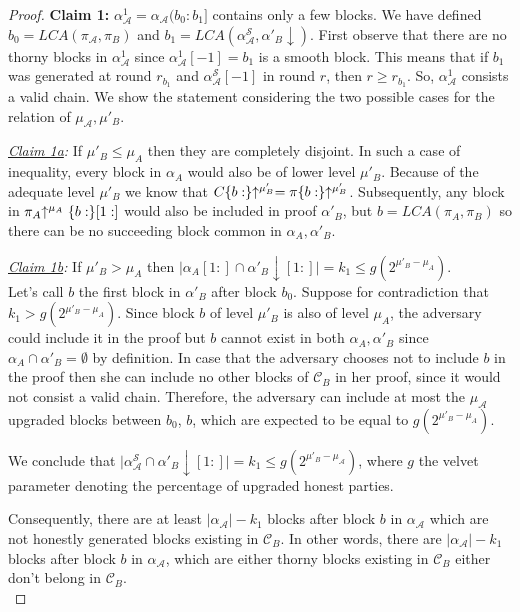 \begin{proof}
\textbf{Claim 1:} $\alpha_\mathcal{A}^1 = \alpha_\mathcal{A}(b_0 : b_1]$ contains only a few blocks. We have defined $b_0 = LCA(\pi_\mathcal{A}, \pi_B)$ and $b_1 = LCA(\alpha^{\mathcal{S}}_\mathcal{A}, \alpha'_B \downarrow)$. First observe that there are no thorny blocks in $\alpha_\mathcal{A}^1$ since $\alpha_\mathcal{A}^1[-1] = b_1$ is a smooth block. This means that if $b_1$ was generated at round $r_{b_1}$ and $\alpha^{\mathcal{S}}_\mathcal{A}[-1]$ in round $r$, then $r \geq r_{b_1}$. So, $\alpha_\mathcal{A}^1$ consists a valid chain. We show the statement considering the two possible cases for the relation of $\mu_\mathcal{A}, \mu'_B$.

\textit{\underline{Claim 1a}:} If $\mu'_B \leq \mu_A$ then they are completely disjoint. In such a case of inequality, every block in $\alpha_A$ would also be of lower level $\mu'_B$. Because of the adequate level $\mu'_B$ we know that $C\{b:\}\negthickspace\uparrow^{\mu'_B} = \pi\{b:\}\negthickspace\uparrow^{\mu'_B}$\cite{nipopows}. Subsequently, any block in $\pi_A\negthickspace\uparrow^{\mu_A}\{b:\}[1:]$ would also be included in proof $\alpha'_B$, but $b=LCA(\pi_A, \pi_B)$ so there can be no succeeding block common in $\alpha_A, \alpha'_B$.

\textit{\underline{Claim 1b}:} If  $\mu'_B > \mu_A$ then $\lvert \alpha_A[1:]  \cap \alpha'_B\downarrow[1:] \rvert = k_1 \leq g(2^{\mu'_B - \mu_A})$.\\
Let's call $b$ the first block in $\alpha'_B$ after block $b_0$. Suppose for contradiction that $k_1 > g(2^{\mu'_B - \mu_A})$.  Since block $b$ of level $\mu'_B$ is also of level $\mu_A$, the adversary could include it in the proof but $b$ cannot exist in both $\alpha_A, \alpha'_B$ since $\alpha_A \cap \alpha'_B = \emptyset$ by definition. In case that the adversary chooses not to include $b$ in the proof then she can include no other blocks of $\mathcal{C}_B$ in her proof, since it would not consist a valid chain. Therefore, the adversary can include at most the $\mu_\mathcal{A}$ upgraded  blocks  between  $b_0$, $b$, which are expected to be equal to $g(2^{\mu'_B - \mu_A})$.

We conclude that $\lvert \alpha^{\mathcal{S}}_\mathcal{A} \cap \alpha'_B\downarrow[1:] \rvert = k_{1} \leq g(2^{\mu'_B - \mu_\mathcal{A}}) $, where $g$ the velvet parameter denoting the percentage of upgraded honest parties.

Consequently, there are at least $\lvert\alpha_\mathcal{A}\rvert - k_1$ blocks after block $b$ in $\alpha_\mathcal{A}$ which are not honestly generated blocks existing in $\mathcal{C}_B$. In other words, there are $\vert \alpha_\mathcal{A} \vert - k_1$ blocks after block $b$ in $\alpha_\mathcal{A}$, which are either thorny blocks existing in $\mathcal{C}_B$ either don't belong in $\mathcal{C}_B$.\\


\end{proof}
